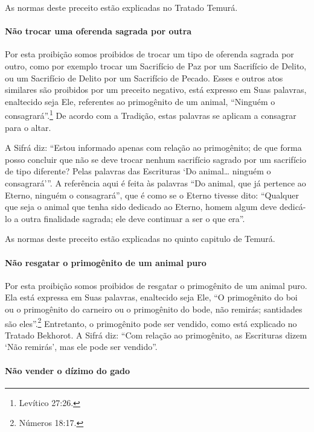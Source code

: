 As normas deste preceito estão explicadas no Tratado Temurá.

\paragraph{Não trocar uma oferenda sagrada por outra}

Por esta proibição somos proibidos de trocar um tipo de oferenda sagrada
por outro, como por exemplo trocar um Sacrifício de Paz por um
Sacrifício de Delito, ou um Sacrifício de Delito por um Sacrifício de
Pecado. Esses e outros atos similares são proibidos por um preceito
negativo, está expresso em Suas palavras, enaltecido seja Ele,
referentes ao primogênito de um animal, ``Ninguém o consagrará''.\footnote{Levítico 27:26.} De acordo com a Tradição, estas palavras se aplicam a
consagrar para o altar.

A Sifrá diz: ``Estou informado apenas com relação ao primogênito; de que
forma posso concluir que não se deve trocar nenhum sacrifício sagrado
por um sacrifício de tipo diferente? Pelas palavras das Escrituras `Do
animal\ldots{} ninguém o consagrará'''. A referência aqui é feita às
palavras ``Do animal, que já pertence ao Eterno, ninguém o consagrará'',
que é como se o Eterno tivesse dito: ``Qualquer que seja o animal que
tenha sido dedicado ao Eterno, homem algum deve dedicá-lo a outra
finalidade sagrada; ele deve continuar a ser o que era''.

As normas deste preceito estão explicadas no quinto capitulo de Temurá.

\paragraph{Não resgatar o primogênito de um animal puro}

Por esta proibição somos proibidos de resgatar o primogênito de um
animal puro. Ela está expressa em Suas palavras, enaltecido seja Ele,
``O primogênito do boi ou o primogênito do carneiro ou o primogênito do
bode, não remirás; santidades são eles''.\footnote{Números 18:17.} Entretanto, o
primogênito pode ser vendido, como está explicado no Tratado Bekhorot. A
Sifrá diz: ``Com relação ao primogênito, as Escrituras dizem `Não
remirás', mas ele pode ser vendido''.

\paragraph{Não vender o dízimo do gado}

